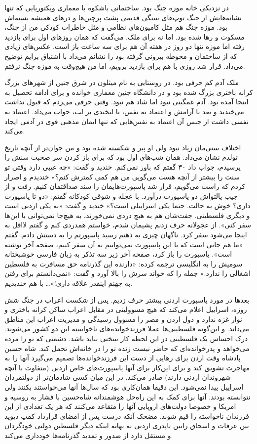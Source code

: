 \documentclass[letterpaper,12pt,oneside]{article}  %
\begin{document}
در نزدیکی خانه موزه جنگ بود. ساختمانی باشکوه با معماری ویکتوریایی که تنها نشانه‌هایش از جنگ توپ‌های سنگی قدیمی پشت پرچین‌ها و در‌های همیشه بسته‌اش بود. موزه جنگ هم مثل کامیون‌های نظامی و مثل خاطرات کودکی من از جنگ، مسکوت و رها شده بود. اما نه برای ملک. می‌گفت که همان روزهای اول برای بازدید رفته اما موزه تنها دو روز در هفته آن هم برای سه ساعت باز است. عکس‌های زیادی که از ساختمان و محوطه بیرونی گرفته بود را نشانم می‌داد با اشتیاق برایم توضیح می‌داد. قرار شد روزی با هم برای بازدید برویم، اما من هیچ‌وقت به موزه جنگ نرفتم.

ملک آدم کم حرفی بود. در روستایی به نام میثلون در شرق جنین از شهرهای بزرگ کرانه باختری بزرگ شده بود و در دانشگاه جنین معماری خوانده و برای ادامه تحصیل به اینجا آمده بود. آدم غمگینی نبود اما شاد هم نبود. وقتی حرفی می‌زدم که قبول نداشت می‌خندید و بعد با آرامش و اعتماد به نفس، با لبخندی بر لب، جواب می‌داد. اعتماد به نفسی داشت از جنس آن اعتماد به نفس‌هایی که تنها ایمان مذهبی قوی در آدمی ایجاد می‌کند.

اختلاف سنی‌مان زیاد نبود ولی او پیر و شکسته شده بود و من جوان‌تر از آنچه تاریخ تولدم نشان‌ می‌داد. همان شب‌های اول بود که برای باز کردن سر صحبت سنش را پرسیدم، جواب داد ۳۰ گفتم که باور نمی‌کنم. خندید و گفت: «چه عیبی دارد وقتی تو سنت را بیشتر از آنچه هست می‌گویی من هم کمی کمترش کنم؟» خندیدم و اصرار کردم که راست می‌گویم، قرار شد پاسپورت‌هایمان را سند صداقتمان کنیم. رفت و از جیب پالتو‌اش دو پاسپورت درآورد. با عجله‌ و شوقی کودکانه گفتم: «دو تا پاسپورت داری؟ خوش به حالت. حتما یکی اسراییلی است؟» خندید و گفت: «نه یکی اردنی است و دیگری فلسطینی. جفت‌شان هم به هیچ دردی نمی‌خورند، به هیچ‌جا نمی‌توانی با این‌ها سفر کنی». از عجولانه حرف زدنم پشیمان شدم، خواستم همدردی کنم و گفتم لااقل به اینجا می‌شود سفر کرد. ناگهان چیزی به ذهنم رسید پاسپورتم را به دستش دادم. گفتم «ما هم جایی است که با این پاسپورت نمی‌توانیم به آن سفر کنیم، صفحه آخر نوشته است». پاسپورت را باز کرد، صفحه آخر زیر سه تذکر به زبان فارسی خوشبختانه سومیش را به انگلیسی ترجمه کرده:‌‌ «دارنده این گذرنامه حق مسافرت به فلسطین اشغالی را ندارد.» جمله را که خواند سرش را بالا آورد و گفت: «نمی‌دانستم برای رفتن به جهنم اینقدر علاقه داری!»… با هم خندیدیم.

بعدها در مورد پاسپورت اردنی بیشتر حرف زدیم. پس از شکست اعراب در جنگ شش روزه، اسراییل اعلام می‌کند که هیچ‌ مسوولیتی در مقابل اعراب ساکن کرانه باختری و نوار غزه ندارد و دول اردن و مصر را مسوول رسیدگی و مدیریت اعراب این مناطق می‌داند. و این‌گونه فلسطینی‌ها عملا فرزند‌خوانده‌های ناخواسته این دو کشور می‌شوند. درک احساس یک فلسطینی در این لحظه کار سختی نباید باشد. دشمنی که تو را مرده می‌خواهد و پدرخوانده‌ای که حاضر نیست زنده تو را در خانه‌اش تحمل کند. شاه حسین پادشاه وقت اردن برای رهایی از دست این فرزند‌خوانده‌ها تصمیم می‌گیرد آنها را به مهاجرت تشویق کند و برای این‌کار برای‌ آنها پاسپورت‌های خاص اردنی (متفاوت با آنچه شهروندان اردنی دارند) صادر می‌کند. در این میان کسی شادمان‌تر از دولتمردان اسراییل پیدا نمی‌شود. این دقیقا هما‌ن‌کاری بود که سال‌ها آنها ‌می‌خواستند بکنند ولی نتوانسته بودند. آنها برای کمک به این راه‌حل هوشمندانه شاه‌حسین با فشار به روسیه و امریکا و خصوصا دولت‌های اروپایی آنها را متقاعد می‌کنند که هر یک تعدادی از این فرزندان ناخواسته را قیم شوند. مضحک آنکه درست پس از امضای قرارداد کمپ دیوید بین عرفات و اسحاق رابین ناپدری اردنی به بهانه اینکه دیگر فلسطین دولتی خود‌گردان و مستقل دارد از صدور و تمدید گذر‌نامه‌ها خود‌داری می‌کند.
\end{document}

